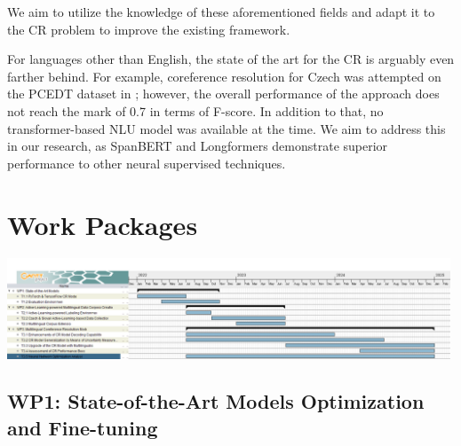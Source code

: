 We aim to utilize the knowledge of these aforementioned fields and adapt it to the CR problem to improve the existing framework.

For languages other than English, the state of the art for the CR is arguably even farther behind. 
For example, coreference resolution for Czech was attempted on the PCEDT dataset \cite{pcedt-Hajic2012} in \cite{cr-cz-Novak17}; however, the overall performance of the approach does not reach the mark of 0.7 in terms of F-score. 
In addition to that, no transformer-based NLU model was available at the time. 
We aim to address this in our research, as SpanBERT and Longformers demonstrate superior performance to other neural supervised techniques.

\section{Work Packages}\label{sec:wp}

\includegraphics[width=0.99\textwidth]{./figs/Timeschedule}

\subsection*{WP1: State-of-the-Art Models Optimization and Fine-tuning}

%
%
%
%


